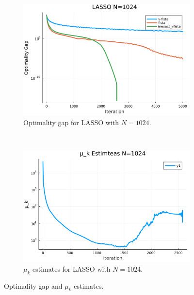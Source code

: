 \documentclass[12pt]{article}
\begin{document}
        \begin{figure}[H]
            \centering
            \begin{subfigure}[b]{0.47\textwidth}
                \centering
                \includegraphics[width=\textwidth]{assets/lasso_loss_1024.png}
                \caption{Optimality gap for LASSO with $N = 1024$.}
            \end{subfigure}
            ~
            \begin{subfigure}[b]{0.47\textwidth}
                \centering
                \includegraphics[width=\textwidth]{assets/lasso_sc_estimates_1024.png}
                \caption{$\mu_k$ estimates for LASSO with $N = 1024$.}
            \end{subfigure}
            \caption{Optimality gap and $\mu_k$ estimates. }
            \label{fig:lasso-experiment-1024}
        \end{figure}
    
\end{document}
